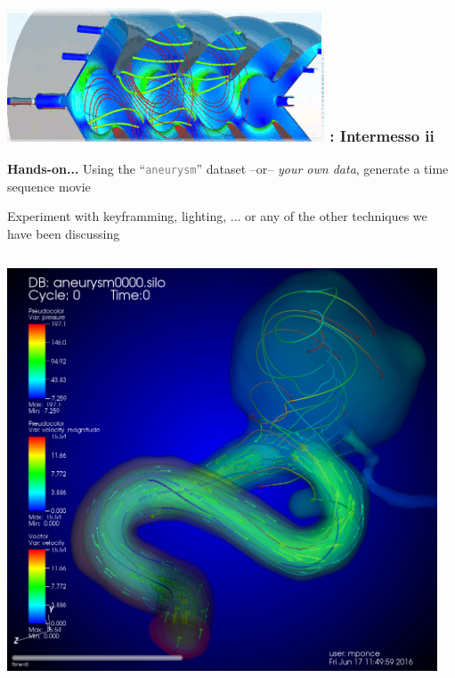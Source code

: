 \handsonEnv
\begin{frame}
\frametitle{\href{https://wci.llnl.gov/simulation/computer-codes/visit/}{\includegraphics[height=.85cm]{figs/visit-logos/VisIt-02}} \hspace{-.85cm}{\bf \textcolor{lightgray}{VisIt}}: Intermesso ii}

\vspace{-1mm}
\begin{beamerboxesrounded}[upper=block head,lower=block body,shadow=true]{\bf Hands-on...}%
        \textcolor{DarkGreen}{} Using the 
                {\small ``\textcolor{gray}{\texttt{aneurysm}}''} dataset
                --or-- \textit{your own data},
		generate a time sequence movie

	\pause
        \textcolor{DarkGreen}{} Experiment with keyframming, lighting, ... or any of the other techniques we have been discussing

\end{beamerboxesrounded}

\pause
\vspace{.75mm}
\begin{columns}
\begin{column}{5cm}
	\includegraphics[width=\columnwidth]{figs/visit-pract/VisIt_aneurysm0}
\end{column}
\begin{column}{6cm}
\end{column}
\end{columns}


\end{frame}
